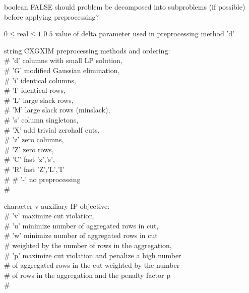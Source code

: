 %
{boolean}%
{FALSE}%
{should problem be decomposed into subproblems (if possible) before applying preprocessing?}%
{}

%
{$0\leq\textrm{real}\leq1$}%
{$0.5$}%
{value of delta parameter used in preprocessing method 'd'}%
{}

%
{string}%
{CXGXIM}%
{preprocessing methods and ordering:\\   \#                      'd' columns with small LP solution,\\   \#                      'G' modified Gaussian elimination,\\   \#                      'i' identical columns,\\   \#                      'I' identical rows,\\   \#                      'L' large slack rows,\\   \#                      'M' large slack rows (minslack),\\   \#                      's' column singletons,\\   \#                      'X' add trivial zerohalf cuts,\\   \#                      'z' zero columns,\\   \#                      'Z' zero rows,\\   \#                      'C' fast {'z','s'},\\   \#                      'R' fast {'Z','L','I'}\\   \#
   \#                      '-' no preprocessing\\   \#}%
{}

%
{character}%
{v}%
{auxiliary IP objective:\\   \#                      'v' maximize cut violation,\\   \#                      'u' minimize number of aggregated rows in cut,\\   \#                      'w' minimize number of aggregated rows in cut\\   \#                          weighted by the number of rows in the aggregation,\\   \#                      'p' maximize cut violation and penalize a high number\\   \#                          of aggregated rows in the cut weighted by the number\\   \#                          of rows in the aggregation and the penalty factor p\\   \#}%
{}

